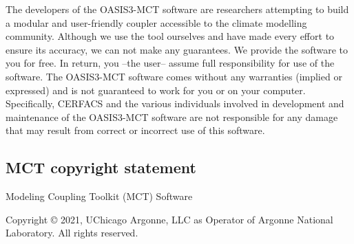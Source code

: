 The developers of the OASIS3-MCT software are researchers attempting to
build a modular and user-friendly coupler accessible to the climate
modelling community. Although we use the tool ourselves and have made
every effort to ensure its accuracy, we can not make any
guarantees. We provide the software to you for free. In return,
you --the user-- assume full responsibility for use of the software. The
OASIS3-MCT software comes without any warranties (implied or expressed) and
is not guaranteed to work for you or on your computer. Specifically,
CERFACS and the various individuals involved in development and
maintenance of the OASIS3-MCT software are not responsible for any damage
that may result from correct or incorrect use of this software.

\subsection{MCT copyright statement}
\label{sec_MCT}

                            Modeling Coupling Toolkit (MCT) Software

Copyright © 2021, UChicago Argonne, LLC as Operator of Argonne National Laboratory. All rights reserved.

